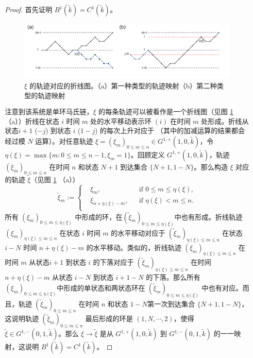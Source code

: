 \begin{appendices}
\begin{proof}
    首先证明 $B^1(\tilde{k})=C^1(\tilde{k})$。
    \begin{figure}[h]
		\centering
		\includegraphics[scale=0.7]{chart/brokenlinegraph.pdf}
		\caption{$\xi$ 的轨迹对应的折线图。（a）第一种类型的轨迹映射（b）第二种类型的轨迹映射}
		\label{fig:linechart}
	\end{figure}
    注意到该系统是单环马氏链，$\xi$ 的每条轨迹可以被看作是一个折线图（见图 \ref{fig:linechart}（a））折线在状态 $i$ 时间 $m$ 处的水平移动表示环 $(i)$ 在时间 $m$ 处形成。折线从状态$i+1$ ($-j$) 到状态 $i$ ($1-j$) 的每次上升对应于 （其中的加减运算的结果都会经过模 $N$ 运算）。对任意轨迹 $\xi=(\xi_m)_{0\le m\le n}\in G^{1,+}(1,0,\tilde{k})$，令 $\eta(\xi)=\max\{m: 0\le m\le n-1,\xi_m=1\}$。回顾定义 $G^{1,+}(1,0,\tilde{k})$，轨迹 $(\xi_m)_{0\le m\le n}$ 在时间 $n$ 和状态 $N+1$ 到达集合 $\{N+1,1-N\}$。那么构造 $\xi$ 对应的轨迹 $\tilde{\xi}$（见图 \ref{fig:linechart} （a））
	\begin{equation*}
		\tilde{\xi}_m
		:=\left\{\begin{aligned}
			&\xi_m,    && \text{if } 0\le m\le \eta(\xi),\\
			&\xi_{n+\eta(\xi)-m},    && \text{if }\eta(\xi)<m\le n.\\
		\end{aligned}\right.
	\end{equation*}
    所有 $(\xi_m)_{0\le m\le \eta(\xi)}$ 中形成的环，在$(\tilde{\xi}_m)_{0\le m\le \eta(\xi)}$中也有形成。折线轨迹 $(\xi_m)_{\eta(\xi)\le m\le n}$ 在状态 $i$ 时间 $m$ 的水平移动对应于 $(\tilde{\xi}_m)_{\eta(\xi)\le m\le n}$ 在状态 $i-N$ 时间 $n+\eta(\xi)-m$ 的水平移动。类似的，折线轨迹 $(\xi_m)_{\eta(\xi)\le m\le n}$ 在时间 $m$ 从状态$i+1$ 到状态 $i$ 的下落对应于 $(\tilde{\xi}_m)_{\eta(\xi)\le m\le n}$ 在时间 $n+\eta(\xi)-m$ 从状态 $i-N$ 到状态 $i+1-N$ 的下落。那么所有 $(\xi_m)_{0\le m\le \eta(\xi)}$中形成的单状态和两状态环在 $(\tilde{\xi}_m)_{0\le m\le \eta(\xi)}$ 中也有对应。而且，轨迹 $(\tilde{\xi}_m)_{0\le m\le n}$ 在时间 $n$ 和状态 $1-N$第一次到达集合 $\{N+1,1-N\}$，这说明轨迹 $(\tilde{\xi}_m)_{0\le m\le n}$ 最后形成的环是 $(1,N,\cdots,2)$，使得 $\tilde{\xi}\in G^{1,-}(0,1,\tilde{k})$。那么 $\xi\to \tilde{\xi}$ 是从 $G^{1,+}(1,0,\tilde{k})$ 到 $G^{1,-}(0,1,\tilde{k})$ 的一一映射，这说明 $B^1(\tilde{k})=C^1(\tilde{k})$。


\end{proof}
\end{appendices}
